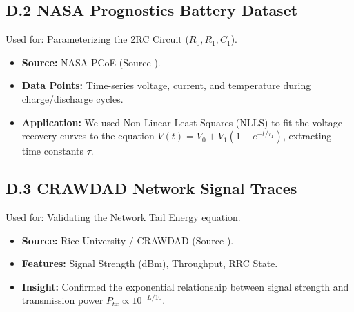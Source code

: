 \documentclass[12pt]{article}
\begin{document}
\subsection*{D.2 NASA Prognostics Battery Dataset}
Used for: Parameterizing the 2RC Circuit ($R_0, R_1, C_1$).
\begin{itemize}
    \item \textbf{Source:} NASA PCoE (Source \cite{8}).
    \item \textbf{Data Points:} Time-series voltage, current, and temperature during charge/discharge cycles.
    \item \textbf{Application:} We used Non-Linear Least Squares (NLLS) to fit the voltage recovery curves to the equation $V(t) = V_0 + V_1(1 - e^{-t/\tau_1})$, extracting time constants $\tau$.
\end{itemize}

\subsection*{D.3 CRAWDAD Network Signal Traces}
Used for: Validating the Network Tail Energy equation.
\begin{itemize}
    \item \textbf{Source:} Rice University / CRAWDAD (Source \cite{13}).
    \item \textbf{Features:} Signal Strength (dBm), Throughput, RRC State.
    \item \textbf{Insight:} Confirmed the exponential relationship between signal strength and transmission power $P_{tx} \propto 10^{-L/10}$.
\end{itemize}

\newpage
\end{document}
